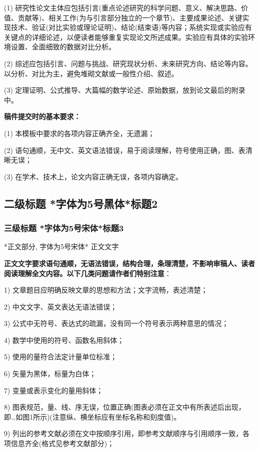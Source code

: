\documentclass[10.5pt,compsoc]{CjC}
\theoremstyle{mystyle}
\begin{document}
\begin{CJK*}{UTF8}{song}
(1) 研究性论文主体应包括引言(重点论述研究的科学问题、意义、解决思路、价值、贡献等)、相关工作(为与引言部分独立的一个章节)、主要成果论述、关键实现技术、验证(对比实验或理论证明)、结论(结束语)等内容；系统实现或实验应有关键点的详细论述，以便读者能够重复实现论文所述成果。实验应有具体的实验环境设置、全面细致的数据对比分析。

(2) 综述应包括引言、问题与挑战、研究现状分析、未来研究方向、结论等内容。以分析、对比为主，避免堆砌文献或一般性介绍、叙述。

(3) 定理证明、公式推导、大篇幅的数学论述、原始数据，放到论文最后的附录中。

{\bf 稿件提交时的基本要求：}

(1) 本模板中要求的各项内容正确齐全，无遗漏；

(2) 语句通顺，无中文、英文语法错误，易于阅读理解，符号使用正确，图、表清晰无误；

(3) 在学术、技术上，论文内容正确无误，各项内容确定。

{\begin{CJK*}{UTF8}{zhhei}\subsection{二级标题 *字体为5号黑体*标题2}\end{CJK*}}
\subsubsection{三级标题 *字体为5号宋体*标题3}
*正文部分, 字体为5号宋体* 正文文字

\textbf{正文文字要求语句通顺，无语法错误，结构合理，条理清楚，不影响审稿人、读者阅读理解全文内容。以下几类问题请作者们特别注意}：

1) 文章题目应明确反映文章的思想和方法；文字流畅，表述清楚；

2) 中文文字、英文表达无语法错误；

3) 公式中无符号、表达式的疏漏，没有同一个符号表示两种意思的情况；

4) 数学中使用的符号、函数名用斜体；

5) 使用的量符合法定计量单位标准；

6) 矢量为黑体，标量为白体；

7) 变量或表示变化的量用斜体；

8) 图表规范，量、线、序无误，位置正确(图表必须在正文中有所表述后出现，即{\ldots}如图1所示)(注意纵、横坐标应有坐标名称和刻度值)。

9) 列出的参考文献必须在文中按顺序引用，即参考文献顺序与引用顺序一致，各项信息齐全(格式见参考文献部分)；


\end{CJK*}
\end{document}
